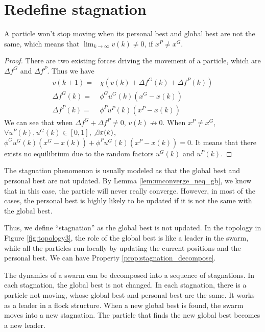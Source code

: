 

\section{Redefine stagnation}
\label{sec:redefine_stagnation}

\begin{lemma}
\label{lem:unconverge_neq_gb}
A particle won't stop moving when its personal best and global best are not the same, 
which means that 
$ \lim_{k \rightarrow \infty} v(k) \neq 0 $, if $ x^{P} \neq x^{G} $.
\begin{proof} 
There are two existing forces driving the movement of a particle, which are $ \Delta f^{G} $ and $ \Delta f^{P} $.
Thus we have
\begin{equation}
\begin{array}{lcl}
v(k+1) = & \chi ( v(k) + \Delta f^{G} (k) + \Delta f^{P} (k) ) \\
\Delta f^{G} (k) = & \phi^{G} u^{G} (k) (x^{G} - x(k)) \\
\Delta f^{P} (k) = & \phi^{P} u^{P} (k) (x^{P} - x(k)) 
\end{array}
\end{equation}
We can see that when $ \Delta f^{G} + \Delta f^{P} \neq 0 $, $ v(k)  \not \rightarrow 0 $.
When $ x^{P} \neq x^{G} $, $ \forall u^{P}(k), u^{G}(k) \in [0, 1] $, $ \not \exists x(k) $, $ \phi^{G} u^{G} (k) (x^{G} - x(k)) + \phi^{P} u^{G} (k) (x^{P} - x(k)) = 0 $.
It means that there exists no equilibrium due to the random factors $ u^{G} (k) $ and $ u^{P} (k) $. 
\end{proof}
\end{lemma}

The stagnation phenomenon is usually modeled as that the global best and personal best are not updated.
By Lemma \ref{lem:unconverge_neq_gb}, we know that in this case, the particle will never really converge.
However, in most of the cases, the personal best is highly likely to be updated if it is not the same with the global best.

Thus, we define ``stagnation'' as the global best is not updated.
In the topology in Figure \ref{fig:topology3}, the role of the global best is like a leader in the swarm, while all the particles run locally by updating the current positions and the personal best.
We can have Property \ref{prop:stagnation_decompose}.

\begin{property}
\label{prop:stagnation_decompose}
The dynamics of a swarm can be decomposed into a sequence of stagnations.
In each stagnation, the global best is not changed.
In each stagnation, there is a particle not moving, whose global best and personal best are the same.
It works as a leader in a flock structure.
When a new global best is found, the swarm moves into a new stagnation.
The particle that finds the new global best becomes a new leader.
\end{property}

